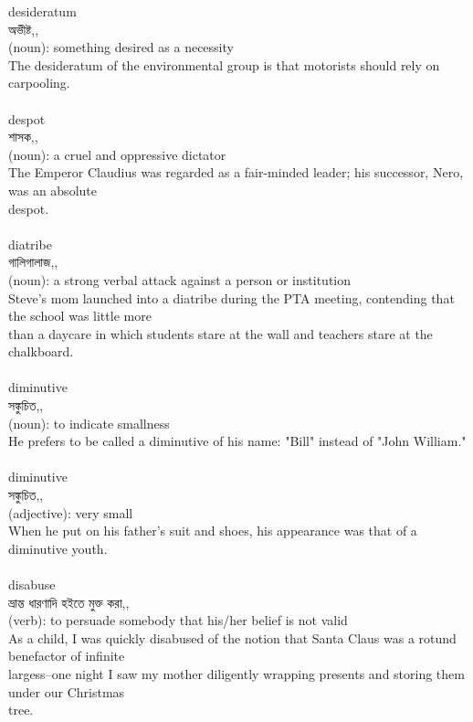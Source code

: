 \documentclass{article}
\begin{document}
{desideratum}\\
{অভীষ্ট,,}\\
{(noun): something desired as a necessity\\The desideratum of the environmental group is that motorists should rely on carpooling.\\}\\
{despot}\\
{শাসক,,}\\
{(noun): a cruel and oppressive dictator\\The Emperor Claudius was regarded as a fair-minded leader; his successor, Nero, was an absolute\\despot.\\}\\
{diatribe}\\
{গালিগালাজ,,}\\
{(noun): a strong verbal attack against a person or institution\\Steve's mom launched into a diatribe during the PTA meeting, contending that the school was little more\\than a daycare in which students stare at the wall and teachers stare at the chalkboard.\\}\\
{diminutive}\\
{সঙ্কুচিত,,}\\
{(noun): to indicate smallness\\He prefers to be called a diminutive of his name: "Bill" instead of "John William."\\}\\
{diminutive}\\
{সঙ্কুচিত,,}\\
{(adjective): very small\\When he put on his father's suit and shoes, his appearance was that of a diminutive youth.\\}\\
{disabuse}\\
{ভ্রান্ত ধারণাদি হইতে মুক্ত করা,,}\\
{(verb): to persuade somebody that his/her belief is not valid\\As a child, I was quickly disabused of the notion that Santa Claus was a rotund benefactor of infinite\\largess--one night I saw my mother diligently wrapping presents and storing them under our Christmas\\tree.\\}\\
\end{document}

